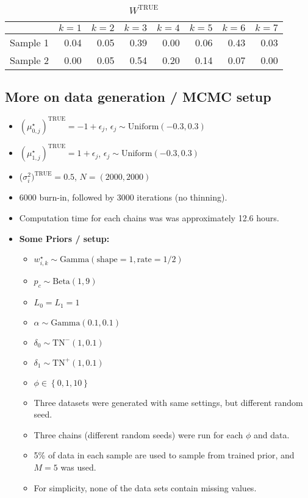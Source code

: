 \documentclass[10pt]{article} %
\newcommand{\bc}[1]{ \left\{#1\right\} }
\newcommand{\Gam}{ \text{Gamma} }
\newcommand{\InvGamma}{ \text{Inv-Gamma} }
\newcommand{\Uniform}{ \text{Uniform} }
\def\Dir{\text{Dirichlet}}
\def\TN{\text{TN}}
\def\true{\text{TRUE}}
\begin{document}
\begin{table}[ht]
  \centering
  \begin{tabular}{rrrrrrrr}
    \hline
    & $k=1$ & $k=2$ & $k=3$ & $k=4$ & $k=5$ & $k=6$ & $k=7$ \\
    \hline
    Sample 1 & 0.04 & 0.05 & 0.39 & 0.00 & 0.06 & 0.43 & 0.03 \\
    Sample 2 & 0.00 & 0.05 & 0.54 & 0.20 & 0.14 & 0.07 & 0.00 \\
    \hline
  \end{tabular}
  \caption{$W^\true$}
  \label{tab:W-true}
\end{table}

\subsection{More on data generation / MCMC setup}
\begin{itemize}
  \item $(\mu_{0,j}^\star)^\true=-1 + \epsilon_j$, $\epsilon_j \sim \Uniform(-0.3, 0.3)$
  \item $(\mu_{1,j}^\star)^\true=1 + \epsilon_j$, $\epsilon_j \sim \Uniform(-0.3, 0.3)$
  \item ($\sigma^2_i)^\true=0.5$, $N=(2000, 2000)$
  \item 6000 burn-in, followed by 3000 iterations (no thinning).
  \item Computation time for each chains was was approximately 12.6 hours.
  \item \textbf{Some Priors / setup:}
  \begin{itemize}
    \item $w^\star_{i,k} \sim \Gam(\text{shape}=1, \text{rate}=1/2)$
    \item $p_c \sim \text{Beta}(1, 9)$
    \item $L_0=L_1=1$
    \item $\alpha \sim \Gam(0.1, 0.1)$
    \item $\delta_0 \sim \TN^-(1, 0.1)$
    \item $\delta_1 \sim \TN^+(1, 0.1)$
    \item $\phi \in \bc{0, 1, 10}$
    \item Three datasets were generated with same settings, but different
      random seed.
    \item Three chains (different random seeds) were run for each $\phi$ and data.
    \item 5\% of data in each sample are used to sample from trained prior, and
      $M=5$ was used.
    \item For simplicity, none of the data sets contain missing values. 
  \end{itemize}
\end{itemize}
\end{document}

